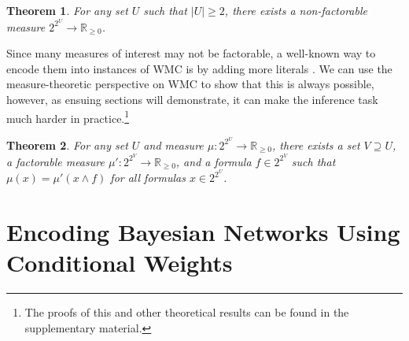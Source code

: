 \documentclass[accepted]{uai2021}
\newtheorem{theorem}{Theorem}
\theoremstyle{definition}
\begin{document}
\begin{theorem}
  For any set $U$ such that $|U| \ge 2$, there exists a non-factorable measure
  $2^{2^{U}} \to \mathbb{R}_{\ge 0}$.
\end{theorem}

Since many measures of interest may not be factorable, a well-known way to
encode them into instances of WMC is by adding more literals
\citep{DBLP:journals/ai/ChaviraD08}. We can use the measure-theoretic
perspective on WMC to show that this is always possible, however, as ensuing
sections will demonstrate, it can make the inference task much harder in
practice.\footnote{The proofs of this and other theoretical results can be found
  in the supplementary material.}

\begin{theorem}
  For any set $U$ and measure $\mu\colon 2^{2^U} \to \mathbb{R}_{\ge 0}$, there
  exists a set $V \supseteq U$, a factorable measure $\mu'\colon 2^{2^V} \to
  \mathbb{R}_{\ge 0}$, and a formula $f \in 2^{2^V}$ such that $\mu(x) = \mu'(x
  \land f)$ for all formulas $x \in 2^{2^U}$.
\end{theorem}

\section{Encoding Bayesian Networks Using Conditional Weights} \label{sec:bns}
\end{document}
